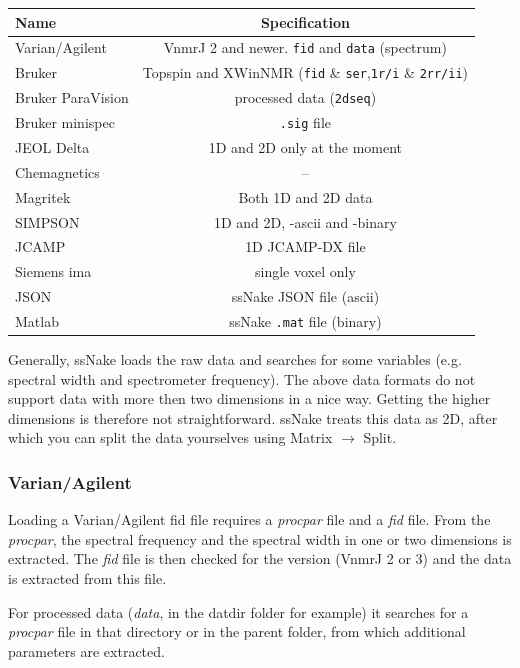 \documentclass[11pt,a4paper]{article}
\begin{document}
\begin{center}
\begin{tabular}{lc}
\toprule
Name & Specification \\
\midrule
\rowcolor{gray!30!white}
Varian/Agilent & VnmrJ 2 and newer. \texttt{fid} and \texttt{data} (spectrum)\\
Bruker & Topspin and XWinNMR (\texttt{fid} \& \texttt{ser},\texttt{1r/i} \& \texttt{2rr/ii}) \\
\rowcolor{gray!30!white}
Bruker ParaVision & processed data (\texttt{2dseq})\\
Bruker minispec  & \texttt{.sig} file\\
\rowcolor{gray!30!white}
JEOL Delta & 1D and 2D only at the moment \\
Chemagnetics & -- \\
\rowcolor{gray!30!white}
Magritek & Both 1D and 2D data \\
SIMPSON & 1D and 2D, -ascii and -binary \\
\rowcolor{gray!30!white}
JCAMP & 1D JCAMP-DX file\\
Siemens ima & single voxel only\\
\rowcolor{gray!30!white}
JSON & ssNake JSON file (ascii)\\
Matlab & ssNake \texttt{.mat} file (binary)\\
\bottomrule
\end{tabular}
\end{center}

Generally, ssNake loads the raw data and searches for some variables (e.g. spectral width and spectrometer frequency). The above data formats do not support data with more then two dimensions in a nice way. Getting the higher dimensions is therefore not straightforward. ssNake treats this data as 2D, after which you can split the data yourselves using Matrix $\rightarrow$ Split.

\subsubsection*{Varian/Agilent}
Loading a Varian/Agilent fid file requires a \textit{procpar} file and a \textit{fid} file. From the \textit{procpar}, the spectral frequency and the spectral width in one or two dimensions is extracted. The \textit{fid} file is then checked for the version (VnmrJ 2 or 3) and the data is extracted from this file.

For processed data (\textit{data}, in the datdir folder for example) it searches for a \textit{procpar} file in that directory or in the parent folder, from which additional parameters are extracted.
\end{document}
